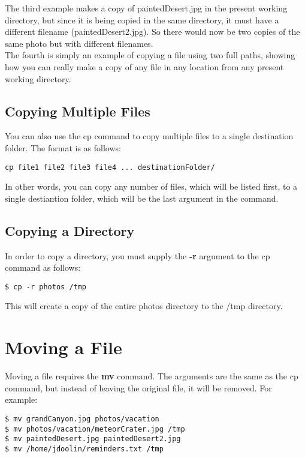 The third example makes a copy of paintedDesert.jpg in the present working directory, but since it is being copied in the same directory, it must have a different filename (paintedDesert2.jpg).  So there would now be two copies of the same photo but with different filenames.\\

The fourth is simply an example of copying a file using two full paths, showing how you can really make a copy of any file in any location from any present working directory.\\

\subsection{Copying Multiple Files}

You can also use the cp command to copy multiple files to a single destination folder.  The format is as follows:

\begin{verbatim}
cp file1 file2 file3 file4 ... destinationFolder/
\end{verbatim}

In other words, you can copy any number of files, which will be listed first, to a single destiantion folder, which will be the last argument in the command.

\subsection{Copying a Directory}

In order to copy a directory, you must supply the \textbf{-r} argument to the cp command as follows:

\begin{verbatim}
$ cp -r photos /tmp
\end{verbatim}

This will create a copy of the entire photos directory to the /tmp directory.

\section{Moving a File}

Moving a file requires the \textbf{mv} command.  The arguments are the same as the cp command, but instead of leaving the original file, it will be removed.  For example:

\begin{verbatim}
$ mv grandCanyon.jpg photos/vacation
$ mv photos/vacation/meteorCrater.jpg /tmp
$ mv paintedDesert.jpg paintedDesert2.jpg
$ mv /home/jdoolin/reminders.txt /tmp
\end{verbatim}

